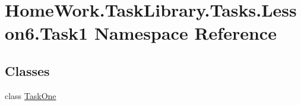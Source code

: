 \hypertarget{namespace_home_work_1_1_task_library_1_1_tasks_1_1_lesson6_1_1_task1}{}\section{Home\+Work.\+Task\+Library.\+Tasks.\+Lesson6.\+Task1 Namespace Reference}
\label{namespace_home_work_1_1_task_library_1_1_tasks_1_1_lesson6_1_1_task1}
\subsection*{Classes}
\begin{DoxyCompactItemize}
\item 
class \mbox{\hyperlink{class_home_work_1_1_task_library_1_1_tasks_1_1_lesson6_1_1_task1_1_1_task_one}{Task\+One}}
\end{DoxyCompactItemize}
